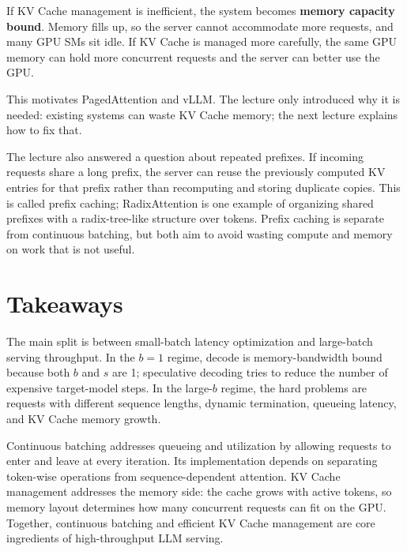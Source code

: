 \documentclass[twoside]{article}
\begin{document}
If KV Cache management is inefficient, the system becomes \textbf{memory capacity bound}.  Memory fills up, so the server cannot accommodate more requests, and many GPU SMs sit idle.  If KV Cache is managed more carefully, the same GPU memory can hold more concurrent requests and the server can better use the GPU.

This motivates PagedAttention and vLLM.  The lecture only introduced why it is needed: existing systems can waste KV Cache memory; the next lecture explains how to fix that.

The lecture also answered a question about repeated prefixes.  If incoming requests share a long prefix, the server can reuse the previously computed KV entries for that prefix rather than recomputing and storing duplicate copies.  This is called prefix caching; RadixAttention is one example of organizing shared prefixes with a radix-tree-like structure over tokens.  Prefix caching is separate from continuous batching, but both aim to avoid wasting compute and memory on work that is not useful.

\section{Takeaways}

The main split is between small-batch latency optimization and large-batch serving throughput.  In the \(b=1\) regime, decode is memory-bandwidth bound because both \(b\) and \(s\) are 1; speculative decoding tries to reduce the number of expensive target-model steps.  In the large-\(b\) regime, the hard problems are requests with different sequence lengths, dynamic termination, queueing latency, and KV Cache memory growth.

Continuous batching addresses queueing and utilization by allowing requests to enter and leave at every iteration.  Its implementation depends on separating token-wise operations from sequence-dependent attention.  KV Cache management addresses the memory side: the cache grows with active tokens, so memory layout determines how many concurrent requests can fit on the GPU.  Together, continuous batching and efficient KV Cache management are core ingredients of high-throughput LLM serving.
\end{document}
